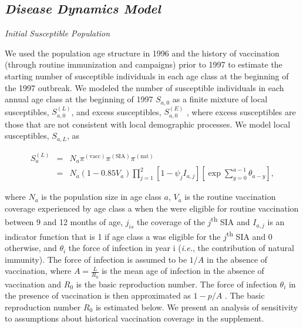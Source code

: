 \subsection{\texorpdfstring{\emph{Disease Dynamics
Model}}{Disease Dynamics Model}}\label{disease-dynamics-model}

\emph{Initial Susceptible Population}

We used the population age structure in 1996 and the history of vaccination (through routine immunization and campaigns) prior to 1997 to estimate the starting number of susceptible individuals in each age class at the beginning of the 1997 outbreak.  We modeled the number of susceptible individuals in each annual age class at the beginning of 1997 \(S_{a,0}\) as a finite mixture of local susceptibles, \(S_{a,0}^{(L)}\), and excess susceptibles, \(S_{a,0}^{(E)}\) , where excess susceptibles are those that are not consistent with local demographic processes.  We model local susceptibles, \(S_{a,L}\), as 

\begin{eqnarray}
S_a^{(L)} &=& N_a \pi^{(\text{vacc})} \pi^{(\text{SIA})}\pi^{(\text{nat})} \\
&=& N_a (1- 0.85 V_a) \prod_{j=1}^2 \left[1- \psi_j I_{a,j} \right] \left[\exp \sum_{y=0}^{a-1} \theta_{a-y} \right],
\end{eqnarray}

where \(N_a\) is the population size in age class \(a\), \(V_a\) is the routine vaccination coverage experienced by age class a when the were eligible for routine vaccination between 9 and 12 months of age, \(j_{is}\) the coverage of the \(j\)\textsuperscript{th} SIA and \(I_{a,j}\) is an indicator function that is 1 if age class a was eligible for the \(j\)\textsuperscript{th} SIA and 0 otherwise, and \(\theta_i\) the force of infection in year i (\emph{i.e.}, the contribution of natural immunity).  The force of infection is assumed to be \(1/A\) in the absence of vaccination, where \(A=\frac{L}{R_0}\) \cite{Anderson_1981} is the mean age of infection in the absence of vaccination and \(R_0\) is the basic reproduction number. The force of infection \(\theta_i\) in the presence of vaccination is then approximated as \(1-p/A\) \cite{Anderson_1981}.  The basic reproduction number \(R_0\) is estimated below.  We present an analysis of sensitivity to assumptions about historical vaccination coverage in the supplement.

